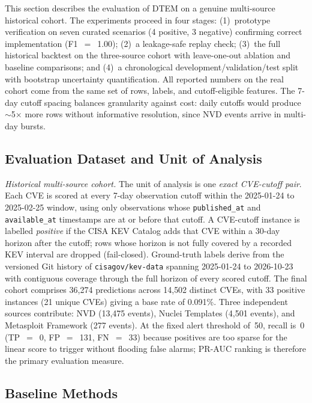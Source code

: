 \documentclass[conference]{IEEEtran}
\begin{document}
This section describes the evaluation of DTEM on a genuine multi-source historical cohort. The experiments proceed in four stages: (1)~prototype verification on seven curated scenarios (4 positive, 3 negative) confirming correct implementation (F1~$=$~1.00); (2)~a leakage-safe replay check; (3)~the full historical backtest on the three-source cohort with leave-one-out ablation and baseline comparisons; and (4)~a chronological development/validation/test split with bootstrap uncertainty quantification. All reported numbers on the real cohort come from the same set of rows, labels, and cutoff-eligible features. The 7-day cutoff spacing balances granularity against cost: daily cutoffs would produce $\sim$5$\times$ more rows without informative resolution, since NVD events arrive in multi-day bursts.

\subsection{Evaluation Dataset and Unit of Analysis}

\textit{Historical multi-source cohort.} The unit of analysis is one \emph{exact CVE-cutoff pair}. Each CVE is scored at every 7-day observation cutoff within the 2025-01-24 to 2025-02-25 window, using only observations whose \texttt{published\_at} and \texttt{available\_at} timestamps are at or before that cutoff. A CVE-cutoff instance is labelled \emph{positive} if the CISA KEV Catalog adds that CVE within a 30-day horizon after the cutoff; rows whose horizon is not fully covered by a recorded KEV interval are dropped (fail-closed). Ground-truth labels derive from the versioned Git history of \texttt{cisagov/kev-data} spanning 2025-01-24 to 2026-10-23 with contiguous coverage through the full horizon of every scored cutoff. The final cohort comprises 36{,}274 predictions across 14{,}502 distinct CVEs, with 33 positive instances (21 unique CVEs) giving a base rate of 0.091\%. Three independent sources contribute: NVD (13{,}475 events), Nuclei Templates (4{,}501 events), and Metasploit Framework (277 events). At the fixed alert threshold of~50, recall is~0 (TP~$=$~0, FP~$=$~131, FN~$=$~33) because positives are too sparse for the linear score to trigger without flooding false alarms; PR-AUC ranking is therefore the primary evaluation measure.

\subsection{Baseline Methods}
\end{document}
